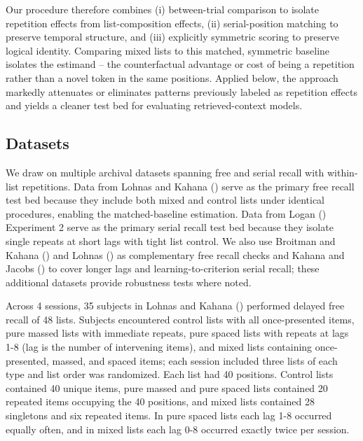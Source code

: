 \documentclass[
  man,
  floatsintext,
  longtable,
  nolmodern,
  notxfonts,
  notimes,
  draftfirst,
  colorlinks=true,linkcolor=blue,citecolor=blue,urlcolor=blue]{apa7}
\begin{document}
Our procedure therefore combines (i) between-trial comparison to isolate
repetition effects from list-composition effects, (ii) serial-position
matching to preserve temporal structure, and (iii) explicitly symmetric
scoring to preserve logical identity. Comparing mixed lists to this
matched, symmetric baseline isolates the estimand -- the counterfactual
advantage or cost of being a repetition rather than a novel token in the
same positions. Applied below, the approach markedly attenuates or
eliminates patterns previously labeled as repetition effects and yields
a cleaner test bed for evaluating retrieved-context models.

\subsection{Datasets}\label{datasets}

We draw on multiple archival datasets spanning free and serial recall
with within-list repetitions. Data from Lohnas and Kahana
() serve as the primary free
recall test bed because they include both mixed and control lists under
identical procedures, enabling the matched-baseline estimation. Data
from Logan () Experiment 2 serve as
the primary serial recall test bed because they isolate single repeats
at short lags with tight list control. We also use Broitman and Kahana
() and Lohnas
() as complementary free recall
checks and Kahana and Jacobs
() to cover longer lags and
learning-to-criterion serial recall; these additional datasets provide
robustness tests where noted.

Across 4 sessions, 35 subjects in Lohnas and Kahana
() performed delayed free recall
of 48 lists. Subjects encountered control lists with all once-presented
items, pure massed lists with immediate repeats, pure spaced lists with
repeats at lags 1-8 (lag is the number of intervening items), and mixed
lists containing once-presented, massed, and spaced items; each session
included three lists of each type and list order was randomized. Each
list had 40 positions. Control lists contained 40 unique items, pure
massed and pure spaced lists contained 20 repeated items occupying the
40 positions, and mixed lists contained 28 singletons and six repeated
items. In pure spaced lists each lag 1-8 occurred equally often, and in
mixed lists each lag 0-8 occurred exactly twice per session.
\end{document}
